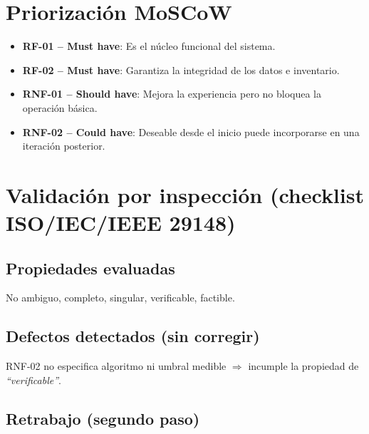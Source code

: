 \documentclass[11pt,a4paper]{article}
\begin{document}

\section{Priorización MoSCoW}

\begin{itemize}[leftmargin=1.2cm]

\item
\textbf{RF-01 -- Must have}:
Es el núcleo funcional del sistema.

\item
\textbf{RF-02 -- Must have}:
Garantiza la integridad de los datos e inventario.

\item
\textbf{RNF-01 -- Should have}:
Mejora la experiencia pero no bloquea la operación básica.

\item
\textbf{RNF-02 -- Could have}:
Deseable desde el inicio puede incorporarse en una iteración posterior.

\end{itemize}



\section{Validación por inspección (checklist ISO/IEC/IEEE 29148)}

\subsection*{Propiedades evaluadas}

No ambiguo, completo, singular, verificable, factible.

\subsection*{Defectos detectados (sin corregir)}

RNF-02 no especifica algoritmo ni umbral medible
$\Rightarrow$
incumple la propiedad de \emph{``verificable''}.

\subsection*{Retrabajo (segundo paso)}
\end{document}
